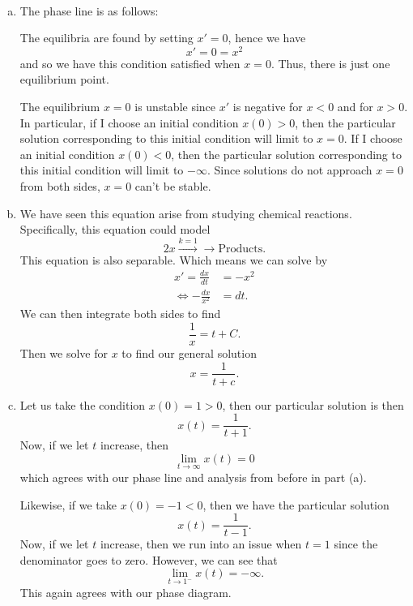 \documentclass[12pt]{article} %
\begin{document}
\begin{solution}~
\begin{enumerate}[(a)]
        \item The phase line is as follows:

                \begin{centering}
                \end{centering}
        
        The equilibria are found by setting $x'=0$, hence we have
        \[
            x'=0=x^2
        \]
        and so we have this condition satisfied when $x=0$.  Thus, there is just one equilibrium point.  

        The equilibrium $x=0$ is unstable since $x'$ is negative for $x<0$ and for $x>0$.  In particular, if I choose an initial condition $x(0)>0$, then the particular solution corresponding to this initial condition will limit to $x=0$. If I choose an initial condition $x(0)<0$, then the particular solution corresponding to this initial condition will limit to $-\infty$.  Since solutions do not approach $x=0$ from both sides, $x=0$ can't be stable.  

        \item We have seen this equation arise from studying chemical reactions.  Specifically, this equation could model
\[
2x \xrightarrow{k=1} \to \textrm{Products}.
\]
This equation is also separable.  Which means we can solve by
\begin{align*}
    x'=\frac{dx}{dt}&=-x^2\\
    \iff -\frac{dx}{x^2}&=dt.
\end{align*}
We can then integrate both sides to find
\[
\frac{1}{x}=t+C.
\]
Then we solve for $x$ to find our general solution
\[
\boxed{x=\frac{1}{t+c}.}
\]
\item Let us take the condition $x(0)=1>0$, then our particular solution is then
\[
x(t) = \frac{1}{t+1}.
\]
Now, if we let $t$ increase, then 
\[
\lim_{t \to \infty} x(t) = 0
\]
which agrees with our phase line and analysis from before in part (a).

Likewise, if we take $x(0)=-1<0$, then we have the particular solution
\[
x(t) = \frac{1}{t-1}.
\]
Now, if we let $t$ increase, then we run into an issue when $t=1$ since the denominator goes to zero.  However, we can see that
\[
\lim_{t\to 1^-} x(t) = -\infty.
\]
This again agrees with our phase diagram.


\end{enumerate}
\end{solution}
\end{document}
